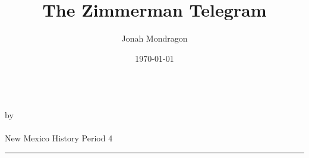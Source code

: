 \documentclass[12pt]{article}
\newcommand{\PutTitle}[1]
{
    \begin{center}
        {\huge\bfseries\thetitle}\\
        by \theauthor\\
        \thedate\\
        #1        
    \end{center}
    \hrule
    \vspace{2ex}
}
\begin{document}
\title{The Zimmerman Telegram}
\author{Jonah Mondragon}
\date{\today}
\PutTitle{New Mexico History Period 4}

\autocite{ZimmermanTelegram}

\pagestyle{headings}
\newpage

\fussy
\printbibliography
\end{document}
